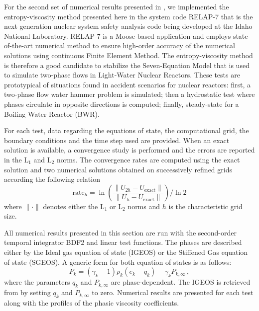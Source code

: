 \documentclass[preprint,10pt]{elsarticle}
\begin{document}
For the second set of numerical results presented in , we implemented the entropy-viscosity method presented here in the system code RELAP-7 \cite{Berry_2014} that is the next generation nuclear system safety analysis code being developed at the Idaho National Laboratory. RELAP-7 is a Moose-based application and employs state-of-the-art numerical method to ensure high-order accuracy of the numerical solutions using continuous Finite Element Method. The entropy-viscosity method is therefore a good candidate to stabilize the Seven-Equation Model that is used to simulate two-phase flows in Light-Water Nuclear Reactors. 
 
These tests are prototypical of situations found in accident scenarios for nuclear reactors: first, a two-phase flow water hammer problem is simulated; then a hydrostatic test 
where phases circulate in opposite directions is computed; finally, steady-state for a Boiling Water Reactor (BWR). 

For each test, data regarding the equations of state, the computational grid, the boundary conditions and the time step used are provided. When an exact solution is available, a convergence study 
is performed and the errors are reported in the L$_1$ and L$_2$ norms. 
The convergence rates are computed using the exact solution and two numerical solutions obtained on successively refined grids according the following relation 
\begin{equation}
\label{eq:conv_rates}
\text{rate}_h = \ln \left( \frac{\| U_{2h}-U_{\text{exact}} \|}{\| U_{h}-U_{\text{exact}}\| } \right) / \ln 2
\end{equation}
where $\| \cdot \|$ denotes either the L$_1$ or L$_2$ norms and $h$ is the characteristic grid size.

All numerical results presented in this section are run with the second-order 
temporal integrator BDF2 \cite{bdf2} and linear test functions. The phases are described either by the Ideal gas equation of state (IGEOS) or the Stiffened Gas equation 
of state (SGEOS). A generic form for both equation of states is as follows:
%
\begin{equation}\label{eq:generic-form}
P_k = (\gamma_k-1) \rho_k (e_k - q_k) - \gamma_k P_{k,\infty} \, ,
\end{equation}
%
where the parameters $q_k$ and $P_{k,\infty}$ are phase-dependent. The IGEOS is retrieved from  by setting $q_k$ and $P_{k,\infty}$ to 
zero. Numerical results are presented for each test along with the profiles of the phasic viscosity coefficients.
%
\end{document}
